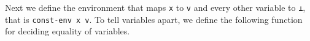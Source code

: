 Next we define the environment that maps \texttt{x} to \texttt{v} and
every other variable to \texttt{⊥}, that is \texttt{const-env\ x\ v}. To
tell variables apart, we define the following function for deciding
equality of variables.

\begin{fence}
\begin{code}%
\>[0]\AgdaSpace{}%
\AgdaSymbol{:}\AgdaSpace{}%
\AgdaSpace{}%
\AgdaSymbol{\{}\AgdaSymbol{\}}\AgdaSpace{}%
\AgdaSpace{}%
\AgdaSymbol{(}\AgdaSpace{}%
\AgdaSpace{}%
\AgdaSymbol{:}\AgdaSpace{}%
\AgdaSpace{}%
\AgdaSpace{}%
\AgdaSymbol{)}\AgdaSpace{}%
\AgdaSpace{}%
\AgdaSpace{}%
\AgdaSymbol{(}\AgdaSpace{}%
\AgdaSpace{}%
\AgdaSymbol{)}\<%
\\
\>[0]\AgdaSpace{}%
\AgdaSpace{}%
%
\>[10]\AgdaSymbol{=}%
\>[13]\AgdaSpace{}%
\<%
\\
\>[0]\AgdaSpace{}%
\AgdaSpace{}%
\AgdaSymbol{(}\AgdaSpace{}%
\AgdaSymbol{\AgdaUnderscore{})}%
\>[14]\AgdaSymbol{=}%
\>[17]\AgdaSpace{}%
\<%
\\
\>[0]\AgdaSymbol{(}\AgdaSpace{}%
\AgdaSymbol{\AgdaUnderscore{})}\AgdaSpace{}%
\AgdaSpace{}%
%
\>[14]\AgdaSymbol{=}%
\>[17]\AgdaSpace{}%
\<%
\\
\>[0]\AgdaSymbol{(}\AgdaSpace{}%
\AgdaSymbol{)}\AgdaSpace{}%
\AgdaSpace{}%
\AgdaSymbol{(}\AgdaSpace{}%
\AgdaSymbol{)}\AgdaSpace{}%
%
\>[23]\AgdaSpace{}%
\AgdaSpace{}%
\<%
\\
\>[0]%
\>[20]\AgdaSymbol{|}%
\>[23]\AgdaSpace{}%
\AgdaSpace{}%
\AgdaSymbol{=}%
\>[35]\AgdaSpace{}%

\end{code}
\end{fence}
